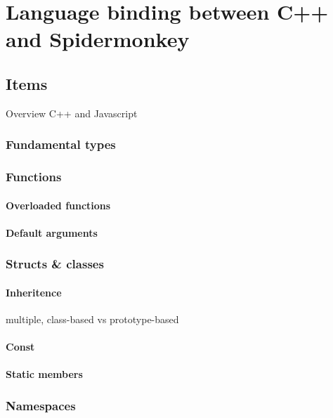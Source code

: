\chapter{Language binding between C++ and Spidermonkey}
\label{chap:LanguageBindingCPPJS}

\section{Items}

Overview C++ and Javascript

\subsection{Fundamental types}

\subsection{Functions}

\subsubsection{Overloaded functions}

\subsubsection{Default arguments}

\subsection{Structs & classes}

\subsubsection{Inheritence}

multiple, class-based vs prototype-based

\subsubsection{Const}

\subsubsection{Static members}

\subsection{Namespaces}

